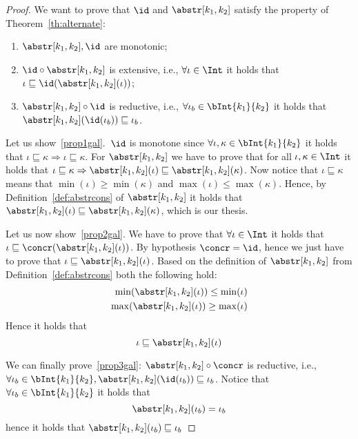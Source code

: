 \begin{proof}
  We want to prove that \(\id\) and \(\abstr[k_1,k_2]\) satisfy the
  property of Theorem~\ref{th:alternate}:
  \begin{enumerate}[label=(\arabic*)]
  \item\label{prop1gal} \(\abstr[k_1,k_2], \id\) are monotonic;
  \item\label{prop2gal} \(\id \circ \abstr[k_1, k_2]\) is
    extensive, i.e., \(\forall \iota \in \Int\) it holds that
    \(\iota \sqsubseteq \id(\abstr[k_1, k_2](\iota))\);
    
  \item\label{prop3gal} \(\abstr[k_1,k_2] \circ \id\) is reductive,
    i.e., \(\forall \iota_b \in \bInt{k_1}{k_2}\) it holds that
    \(\abstr[k_1, k_2](\id(\iota_b)) \sqsubseteq \iota_b\).
  \end{enumerate}

  \medskip

  \noindent
  Let us show~\ref{prop1gal}.\ \(\id\) is monotone since
  \(\forall \iota, \kappa \in \bInt{k_1}{k_2}\) it holds that
  \(\iota \sqsubseteq \kappa \Rightarrow \iota \sqsubseteq
  \kappa\). For \(\abstr[k_1,k_2]\) we have to prove that for all
  \(\iota, \kappa \in \Int\) it holds that
  \(\iota \sqsubseteq \kappa \Rightarrow \abstr[k_1,k_2](\iota)
  \sqsubseteq \abstr[k_1,k_2](\kappa)\). Now notice that
  \(\iota \sqsubseteq \kappa \) means that
  \(\min(\iota) \geq \min(\kappa)\) and
  \(\max(\iota) \leq \max(\kappa)\). Hence, by
  Definition~\ref{def:abstrcons} of \(\abstr[k_1, k_2]\) it holds that
  \(\abstr[k_1, k_2](\iota) \sqsubseteq \abstr[k_1, k_2](\kappa)\),
  which is our thesis.

  \medskip

  \noindent
  Let us now show~\ref{prop2gal}. We have to prove that
  \(\forall \iota \in \Int\) it holds that
  \(\iota \sqsubseteq \concr(\abstr[k_1,k_2](\iota))\). By hypothesis
  \(\concr = \id\), hence we just have to prove that
  \(\iota \sqsubseteq \abstr[k_1, k_2](\iota)\). Based on the
  definition of \(\abstr[k_1, k_2]\) from
  Definition~\ref{def:abstrcons} both the following hold:
  \begin{align*}
    \min(\abstr[k_1,k_2](\iota)) \leq \min(\iota) \\
    \max(\abstr[k_1,k_2](\iota)) \geq \max(\iota)
  \end{align*}
  Hence it holds that
  \begin{equation}
    \iota \sqsubseteq \abstr[k_1, k_2](\iota)
  \end{equation}

  \medskip

  \noindent
  We can finally prove~\ref{prop3gal}:
  \(\abstr[k_1, k_2] \circ \concr\) is reductive, i.e.,
  \(\forall \iota_b \in \bInt{k_1}{k_2}, \abstr[k_1,k_2](\id(\iota_b))
  \sqsubseteq \iota_b\).  Notice that
  \(\forall \iota_b \in \bInt{k_1}{k_2}\) it holds that
  \begin{equation}\label{eq:injection}
    \abstr[k_1,k_2](\iota_b) = \iota_b
  \end{equation}
  hence it holds that \(\abstr[k_1,k_2](\iota_b) \sqsubseteq \iota_b\)
\end{proof}

